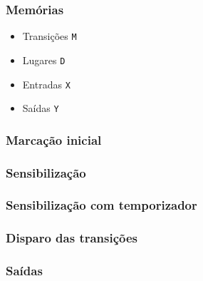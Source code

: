 \documentclass{beamer}
\begin{document}
\begin{frame}
\frametitle{Memórias}
\begin{itemize}
	\item Transições \rightarrow \lstinline{M}
	\item Lugares \rightarrow \lstinline{D}
	\item Entradas \rightarrow \lstinline{X}
	\item Saídas \rightarrow \lstinline{Y}
\end{itemize}
\end{frame}

\begin{frame}
\frametitle{Marcação inicial}


\end{frame}

\begin{frame}
\frametitle{Sensibilização}


\end{frame}

\begin{frame}
\frametitle{Sensibilização com temporizador}


\end{frame}


\begin{frame}
\frametitle{Disparo das transições}


\end{frame}

\begin{frame}
\frametitle{Saídas}


\end{frame}
\end{document}
